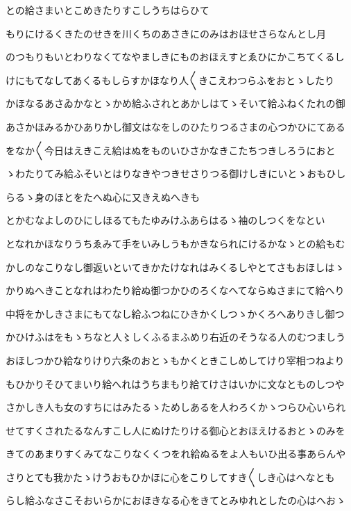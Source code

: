 \documentclass[a4paper,11pt,landscape]{ltjtarticle}
\begin{document}
\par\medskip
との給さまいとこめきたりすこしうちはらひて
\par\medskip
もりにけるくきたのせきを川くちのあさきにのみはおほせさらなんとし月
\par\medskip
のつもりもいとわりなくてなやましきにものおほえすとゑひにかこちてくるし
\par\medskip
けにもてなしてあくるもしらすかほなり人〱きこえわつらふをおとゝしたり
\par\medskip
かほなるあさゐかなとゝかめ給ふされとあかしはてゝそいて給ふねくたれの御
\par\medskip
あさかほみるかひありかし御文はなをしのひたりつるさまの心つかひにてある
\par\medskip
をなか〱今日はえきこえ給はぬをものいひさかなきこたちつきしろうにおと
\par\medskip
ゝわたりてみ給ふそいとはりなきやつきせさりつる御けしきにいとゝおもひし
\par\medskip
らるゝ身のほとをたへぬ心に又きえぬへきも
\par\medskip
とかむなよしのひにしほるてもたゆみけふあらはるゝ袖のしつくをなとい
\par\medskip
となれかほなりうちゑみて手をいみしうもかきなられにけるかなゝとの給もむ
\par\medskip
かしのなこりなし御返いといてきかたけなれはみくるしやとてさもおほしはゝ
\par\medskip
かりぬへきことなれはわたり給ぬ御つかひのろくなへてならぬさまにて給へり
\par\medskip
中将をかしきさまにもてなし給ふつねにひきかくしつゝかくろへありきし御つ
\par\medskip
かひけふはをもゝちなと人〻しくふるまふめり右近のそうなる人のむつましう
\par\medskip
おほしつかひ給なりけり六条のおとゝもかくときこしめしてけり宰相つねより
\par\medskip
もひかりそひてまいり給へれはうちまもり給てけさはいかに文なとものしつや
\par\medskip
さかしき人も女のすちにはみたるゝためしあるを人わろくかゝつらひ心いられ
\par\medskip
せてすくされたるなんすこし人にぬけたりける御心とおほえけるおとゝのみを
\par\medskip
きてのあまりすくみてなこりなくくつをれ給ぬるをよ人もいひ出る事あらんや
\par\medskip
さりとても我かたゝけうおもひかほに心をこりしてすき〱しき心はへなとも
\par\medskip
らし給ふなさこそおいらかにおほきなる心をきてとみゆれとしたの心はへおゝ
\end{document}
